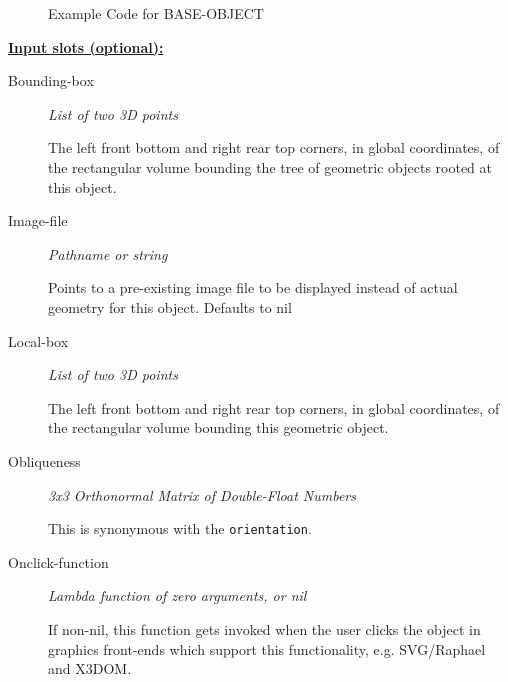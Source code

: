 \documentclass [11pt]{book}
\begin{document}
\begin{itemize}
\begin{figure}
\begin{lrbox}{\boxedverb}
\begin{minipage}{\linewidth}
{\begin{verbatim}
\end{verbatim}}
\end{minipage}
\end{lrbox}
\fbox{\usebox{\boxedverb}}

\caption{Example Code for BASE-OBJECT}

\label{fig:example-code-BASE-OBJECT}

\end{figure}





\textbf{
\underline{Input slots (optional):}}

\begin{description}

\item [Bounding-box]
\emph{List of two 3D points}

 The left front bottom and right rear top corners, in global coordinates,
of the rectangular volume bounding the tree of geometric objects rooted at this object.




\item [Image-file]
\emph{Pathname or string}

 Points to a pre-existing image file to be displayed instead of actual geometry for this object. Defaults to nil




\item [Local-box]
\emph{List of two 3D points}

 The left front bottom and right rear top corners, in global coordinates,
of the rectangular volume bounding this geometric object.




\item [Obliqueness]
\emph{3x3 Orthonormal Matrix of Double-Float Numbers}

 This is synonymous with the \texttt{orientation}.




\item [Onclick-function]
\emph{Lambda function of zero arguments, or nil}

 If non-nil, this
function gets invoked when the user clicks the object in graphics
front-ends which support this functionality, e.g. SVG/Raphael and X3DOM.





\end{description}
\end{itemize}
\end{document}
